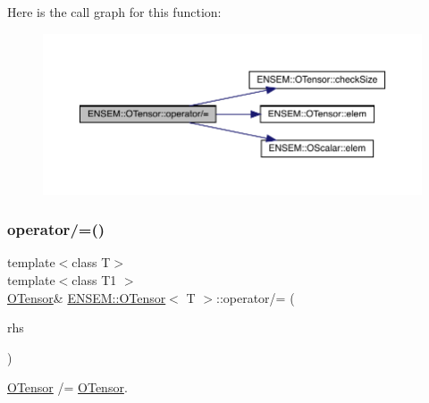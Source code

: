 Here is the call graph for this function\+:
\nopagebreak
\begin{figure}[H]
\begin{center}
\leavevmode
\includegraphics[width=350pt]{da/d8a/classENSEM_1_1OTensor_a02520659679c7946a5bb0ce75b3824cb_cgraph}
\end{center}
\end{figure}
\mbox{\label{classENSEM_1_1OTensor_af8fb32358b6c05989221297a9b33096c}} 
\subsubsection{\texorpdfstring{operator/=()}{operator/=()}\hspace{0.1cm}{\footnotesize\ttfamily [4/6]}}
{\footnotesize\ttfamily template$<$class T$>$ \\
template$<$class T1 $>$ \\
\mbox{\hyperlink{classENSEM_1_1OTensor}{O\+Tensor}}\& \mbox{\hyperlink{classENSEM_1_1OTensor}{E\+N\+S\+E\+M\+::\+O\+Tensor}}$<$ T $>$\+::operator/= (\begin{DoxyParamCaption}\item[{const \mbox{\hyperlink{classENSEM_1_1OTensor}{O\+Tensor}}$<$ T1 $>$ \&}]{rhs }\end{DoxyParamCaption})\hspace{0.3cm}{\ttfamily [inline]}}



\mbox{\hyperlink{classENSEM_1_1OTensor}{O\+Tensor}} /= \mbox{\hyperlink{classENSEM_1_1OTensor}{O\+Tensor}}. 

